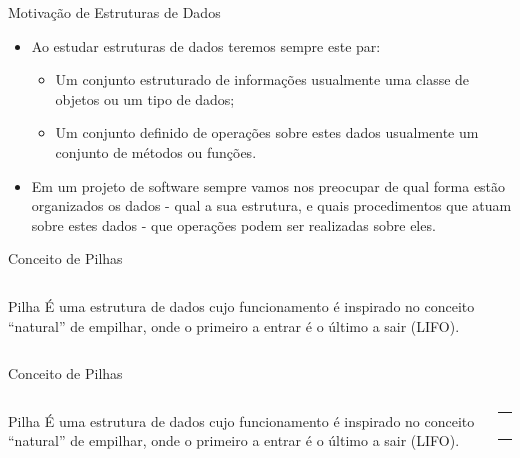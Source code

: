 \documentclass[12pt,table,xcolor={dvipsnames}]{beamer}
\begin{document}
\begin{frame}{Motivação de Estruturas de Dados}
\begin{itemize}
\item Ao estudar estruturas de dados teremos sempre este par:
\begin{itemize}
\item Um conjunto estruturado de informações usualmente uma classe de objetos ou um tipo de dados;
\item Um conjunto definido de operações sobre estes dados usualmente um conjunto de métodos ou funções.
\end{itemize}
\item Em um projeto de software sempre vamos nos preocupar de qual forma estão organizados os dados - qual a sua estrutura, e quais procedimentos que atuam sobre estes dados - que operações podem ser realizadas sobre eles.
\end{itemize}
\end{frame}

\begin{frame}{Conceito de Pilhas}
\begin{columns}
\begin{block}{Pilha}
É uma estrutura de dados cujo funcionamento é inspirado no conceito “natural” de empilhar, onde o primeiro a entrar é o último a sair (LIFO).
\end{block}
\begin{center}
\end{center}
\end{columns}
\end{frame}

\begin{frame}{Conceito de Pilhas}
\begin{columns}
\begin{block}{Pilha}
É uma estrutura de dados cujo funcionamento é inspirado no conceito “natural” de empilhar, onde o primeiro a entrar é o último a sair (LIFO).
\end{block}
\begin{center}
{
\begin{tabular}{ |p{.5cm}| }
\hline
 \\ \hline
 \\ \hline
 \\ \hline
 \\ \hline
 \\ \hline
  \\ \hline
\end{tabular}
}
\end{center}
\end{columns}
\end{frame}
\end{document}
